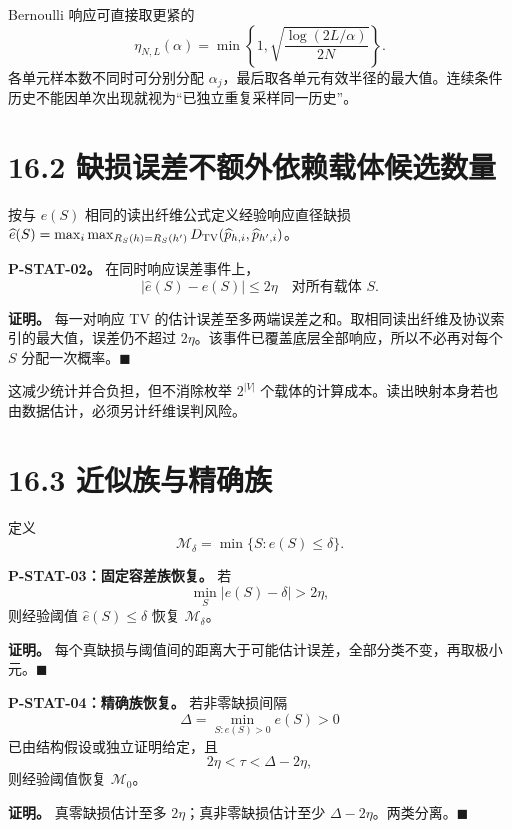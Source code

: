 \documentclass[
  11pt,
  oneside]{book}
\begin{document}
Bernoulli 响应可直接取更紧的 \[\eta_{N,L}(\alpha)=
\min\left\{1,\sqrt{\frac{\log(2L/\alpha)}{2N}}\right\}.\] 各单元样本数不同时可分别分配 \(\alpha_j\)，最后取各单元有效半径的最大值。连续条件历史不能因单次出现就视为``已独立重复采样同一历史''。

\section{16.2 缺损误差不额外依赖载体候选数量}\label{ux7f3aux635fux8befux5deeux4e0dux989dux5916ux4f9dux8d56ux8f7dux4f53ux5019ux9009ux6570ux91cf}

\hypertarget{p-stat-02}{}\label{p-stat-02}

按与 \(e(S)\) 相同的读出纤维公式定义经验响应直径缺损 \(\widehat e(S)=\max_i\max_{R_S(h)=R_S(h')}D_{\rm TV}(\widehat p_{h,i},\widehat p_{h',i})\)。

\textbf{P-STAT-02。} 在同时响应误差事件上， \[|\widehat e(S)-e(S)|\le2\eta
\quad\text{对所有载体 }S.\]

\textbf{证明。} 每一对响应 TV 的估计误差至多两端误差之和。取相同读出纤维及协议索引的最大值，误差仍不超过 \(2\eta\)。该事件已覆盖底层全部响应，所以不必再对每个 \(S\) 分配一次概率。\(\blacksquare\)

这减少统计并合负担，但不消除枚举 \(2^{|V|}\) 个载体的计算成本。读出映射本身若也由数据估计，必须另计纤维误判风险。

\section{16.3 近似族与精确族}\label{ux8fd1ux4f3cux65cfux4e0eux7cbeux786eux65cf}

定义 \[\mathcal M_\delta=\min\{S:e(S)\le\delta\}.\]

\hypertarget{p-stat-03}{}\label{p-stat-03}

\textbf{P-STAT-03：固定容差族恢复。} 若 \[\min_S|e(S)-\delta|>2\eta,\] 则经验阈值 \(\widehat e(S)\le\delta\) 恢复 \(\mathcal M_\delta\)。

\textbf{证明。} 每个真缺损与阈值间的距离大于可能估计误差，全部分类不变，再取极小元。\(\blacksquare\)

\hypertarget{p-stat-04}{}\label{p-stat-04}

\textbf{P-STAT-04：精确族恢复。} 若非零缺损间隔 \[\Delta=\min_{S:e(S)>0}e(S)>0\] 已由结构假设或独立证明给定，且 \[2\eta<\tau<\Delta-2\eta,\] 则经验阈值恢复 \(\mathcal M_0\)。

\textbf{证明。} 真零缺损估计至多 \(2\eta\)；真非零缺损估计至少 \(\Delta-2\eta\)。两类分离。\(\blacksquare\)
\end{document}
